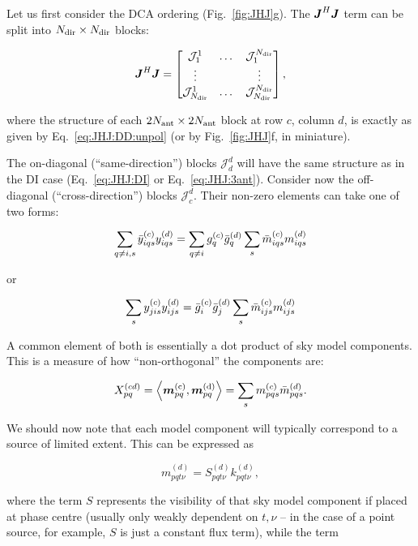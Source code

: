 \documentclass[useAMS,usenatbib]{mn2e}
\makeatletter
\newcommand{\mat}[1]{{\bmath{#1}}}
\newcommand{\JJ}{\mat{J}} %
\newcommand{\JHJ}{\JJ^H\JJ} %
\newcommand{\Matrix}[2]{\left [ \begin{array}{@{}#1@{}}#2\end{array} \right ]}
\makeatother
\begin{document}
Let us first consider the DCA ordering (Fig.~\ref{fig:JHJ}g). The $\JHJ$ term can be split into $N_\mathrm{dir}\times N_\mathrm{dir}$ blocks:

\newcommand{\JJJ}{\mathcal{J}}

\begin{equation}
\label{eq:JHJ:DD:blocked}
\JHJ = \Matrix{ccc}{\JJJ^1_1 & \dots & \JJJ^{\Nd}_1 \\
\vdots & & \vdots \\
\JJJ_{\Nd}^1 & \dots & \JJJ_{\Nd}^{\Nd} },
\end{equation}

where the structure of each $2N_\mathrm{ant}\times2N_\mathrm{ant}$ block at row $c$, column $d$, is exactly as 
given by Eq.~\ref{eq:JHJ:DD:unpol} (or by Fig.~\ref{fig:JHJ}f, in miniature). 


The on-diagonal (``same-direction'') blocks $\JJJ^d_d$ will have the same structure as in the DI 
case (Eq.~\ref{eq:JHJ:DI} or Eq.~\ref{eq:JHJ:3ant}). Consider now the off-diagonal (``cross-direction'') 
blocks $\JJJ^d_c$. Their non-zero elements can take one of two forms:

\[
  \sum\limits_{q\ne i,s} \bar{y}^{(c)}_{iqs} y^{(d)}_{iqs} = \sum\limits_{q\ne i} g^{(c)}_q \bar{g}^{(d)}_q \sum_s \bar{m}^{(c)}_{iqs} m^{(d)}_{iqs}
\]

or

\begin{equation}
  \sum\limits_{s} y^{(c)}_{jis} y^{(d)}_{ijs} = \bar{g}^{(c)}_i \bar{g}^{(d)}_j \sum_s \bar{m}^{(c)}_{ijs} m^{(d)}_{ijs}
\label{eq:JHJ:DD:crossterms}
\end{equation}

A common element of both is essentially a dot product of sky model components. This is a 
measure of how ``non-orthogonal'' the components are:

\begin{equation}
\label{eq:Xpqcd}
X_{pq}^{(cd)} = \left \langle \bmath{m}_{pq}^\mathrm{(c)},\bmath{m}^\mathrm{(d)}_{pq} \right \rangle = \sum_s \mmc_{pqs} \mmdH_{pqs}.
\end{equation}

We should now note that each model component will typically correspond to a source of limited extent. This can be 
expressed as

\[
m_{pqt\nu}^{(d)} = S^{(d)}_{pqt\nu} k^{(d)}_{pqt\nu}, 
\]

where the term $S$ represents the visibility of that sky model component if placed at phase centre (usually 
only weakly dependent on $t,\nu$ -- in the case of a point source, for example, $S$ is just a constant flux term),
while the term
\end{document}
